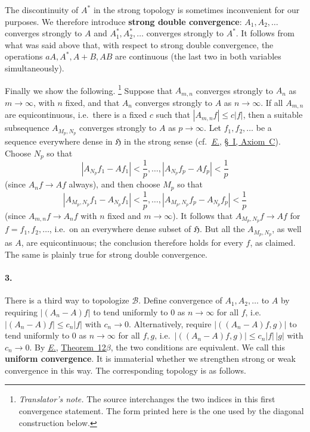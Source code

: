 \documentclass[
  paper=b5,
  twoside=true,
  fontsize=13pt,
  headings=normal,
  bookmarkpackage=false
]{scrartcl}
\theoremstyle{definition}
\newcommand{\Eref}{\hyperref[fn:E-paper]{\emph{E.}}}
\newcommand{\ErefText}[1]{\href{https://doi.org/10.1007/BF01782338}{#1}}
\newcounter{translatornote}
\newcounter{savedfootnote}
\newcommand{\TranslatorNote}[1]{%
  \stepcounter{translatornote}%
  \setcounter{savedfootnote}{\value{footnote}}%
  \begingroup
    \renewcommand{\thefootnote}{T\arabic{translatornote}}%
    \footnote{\textit{Translator's note.} #1}%
  \endgroup
  \setcounter{footnote}{\value{savedfootnote}}}
\begin{document}
The discontinuity of $A^*$ in the strong topology is sometimes
inconvenient for our purposes. We therefore introduce \textbf{strong double
convergence}: $A_1,A_2,\ldots$ converges strongly to $A$ and
$A_1^*,A_2^*,\ldots$ converges strongly to $A^*$.
It follows from what was said above that, with respect to strong
double convergence, the operations $aA,A^*,A+B,AB$ are continuous (the
last two in both variables simultaneously).

Finally we show the following.\TranslatorNote{The source
interchanges the two indices in this first convergence statement.  The
form printed here is the one used by the diagonal construction below.}
Suppose that $A_{m,n}$ converges strongly to
$A_n$ as $m\to\infty$, with $n$ fixed,
and that $A_n$ converges strongly to
$A$ as $n\to\infty$. If all $A_{m,n}$ are equicontinuous, i.e.\ there is a
fixed $c$ such that $|A_{m,n}f|\leq c|f|$,
then a suitable subsequence $A_{M_p,N_p}$ converges strongly to $A$ as $p\to\infty$. Let $f_1,f_2,\ldots$ be a sequence everywhere dense in
$\mathfrak H$ in the strong sense (cf.\ \Eref, \ErefText{\S~I, Axiom~C}). Choose $N_p$ so
that
\[
 |A_{N_p}f_1-Af_1|<\frac1p,\ldots,
 |A_{N_p}f_p-Af_p|<\frac1p
\]
(since $A_nf\to Af$ always), and then choose $M_p$ so that
\[
 |A_{M_p,N_p}f_1-A_{N_p}f_1|<\frac1p,\ldots,
 |A_{M_p,N_p}f_p-A_{N_p}f_p|<\frac1p
\]
(since $A_{m,n}f\to A_nf$ with $n$ fixed and $m\to\infty$). It follows that $A_{M_p,N_p}f\longrightarrow Af$
for $f=f_1,f_2,\ldots$, i.e.\ on an everywhere dense subset of
$\mathfrak H$. But all the $A_{M_p,N_p}$, as well as $A$, are
equicontinuous; the conclusion therefore holds for every $f$, as claimed.
The same is plainly true for strong double convergence.

\paragraph*{3.}\label{sec:topologies-3}
There is a third way to topologize $\mathcal B$. Define convergence of
$A_1,A_2,\ldots$ to $A$ by requiring $|(A_n-A)f|$ to tend uniformly to $0$
as $n\to\infty$ for all $f$, i.e.\ $|(A_n-A)f|\leq c_n|f|$ with
$c_n\to0$. Alternatively, require $|((A_n-A)f,g)|$ to tend uniformly to $0$
as $n\to\infty$ for all $f,g$, i.e.\ $|((A_n-A)f,g)|\leq c_n|f|\,|g|$ with
$c_n\to0$. By \Eref, \ErefText{Theorem~12$\beta$}, the two conditions are
equivalent. We call this \textbf{uniform convergence}. It is immaterial
whether we strengthen strong or weak convergence in this way.
The corresponding topology is as follows.
\end{document}
